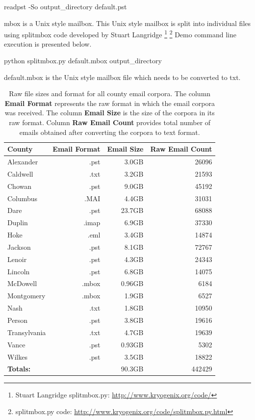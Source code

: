 \documentclass[fleqn]{MJDArticle}
\begin{document}
\begin{code}
 readpst -So output_directory default.pst
\end{code}
 mbox is a Unix style mailbox. This Unix style mailbox is split into individual files using splitmbox code developed by Stuart Langridge \footnote{Stuart Langridge splitmbox.py: \href{http://www.kryogenix.org/code/}{http://www.kryogenix.org/code/} } \footnote{splitmbox.py code: \href{http://www.kryogenix.org/code/splitmbox.py.html}{http://www.kryogenix.org/code/splitmbox.py.html}}
 Demo command line execution is presented below. 
 \begin{code}
 python splitmbox.py default.mbox output_directory
 \end{code}
 default.mbox is the Unix style mailbox file which needs to be converted to txt. 
\begin{table}[ht]
\caption{\label{tab:county format} Raw file sizes and format for all county email corpora. The column  \textbf{Email Format} represents the raw format in which the email corpora was received. The column \textbf{Email Size} is the size of the corpora in its raw format. Column \textbf{Raw Email Count} provides total number of emails obtained after converting the corpora to text format.}
\centering
\begin{tabular}{lrrr}
  \hline
 \textbf{County} & \textbf{Email Format} & \textbf{Email Size} & \textbf{Raw Email Count} \\
  \hline
  \rowcolor{Grey}
Alexander & .pst &3.0GB & 26096 \\
Caldwell & .txt & 3.2GB & 21593\\
\rowcolor{Grey}
Chowan & .pst &9.0GB & 45192 \\
Columbus & .MAI &4.4GB &  31031 \\
\rowcolor{Grey}
Dare & .pst & 23.7GB & 68088 \\
Duplin & .imap & 6.9GB & 37330\\
\rowcolor{Grey}
Hoke & .eml & 3.4GB & 14874 \\
Jackson & .pst & 8.1GB & 72767 \\
\rowcolor{Grey}
Lenoir & .pst  & 4.3GB & 24343 \\
Lincoln & .pst  & 6.8GB  & 14075 \\
\rowcolor{Grey}
McDowell & .mbox & 0.96GB & 6184\\
Montgomery & .mbox & 1.9GB & 6527\\
\rowcolor{Grey}
Nash & .txt & 1.8GB & 10950 \\
Person & .pst & 3.8GB & 19616 \\
\rowcolor{Grey}
Transylvania & .txt & 4.7GB & 19639\\
Vance & .pst & 0.93GB& 5302 \\
\rowcolor{Grey}
Wilkes & .pst & 3.5GB & 18822 \\
   \hline
   \textbf{Totals:} &  & 90.3GB & 442429 \\
   \hline
\end{tabular}
\end{table}
\end{document}
